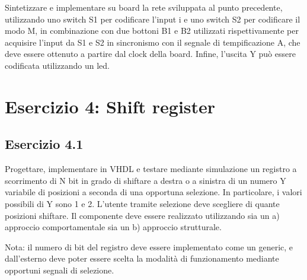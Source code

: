 \begin{traccia}
	Sintetizzare e implementare su board la rete sviluppata al punto precedente, utilizzando
	uno switch S1 per codificare l'input i e uno switch S2 per codificare il modo M, in
	combinazione con due bottoni B1 e B2 utilizzati rispettivamente per acquisire l'input da
	S1 e S2 in sincronismo con il segnale di tempificazione A, che deve essere ottenuto a
	partire dal clock della board. Infine, l'uscita Y può essere codificata utilizzando un led.
\end{traccia}

\sintesiboard
{}

\section{Esercizio 4: Shift register}

\subsection{Esercizio 4.1}

\begin{traccia}
	Progettare, implementare in VHDL e testare mediante simulazione un registro a scorrimento
	di N bit in grado di shiftare a destra o a sinistra di un numero Y variabile di posizioni
	a seconda di una opportuna selezione. In particolare, i valori possibili di Y sono 1 e 2.
	L'utente tramite selezione deve scegliere di quante posizioni shiftare. Il componente deve
	essere realizzato utilizzando sia un a) approccio comportamentale sia un b) approccio strutturale.

	Nota: il numero di bit del registro deve essere implementato come un generic, e
	dall'esterno deve poter essere scelta la modalità di funzionamento mediante opportuni
	segnali di selezione.
\end{traccia}

\progetto
{}

\implementazione
{}

\simulazione
{}

